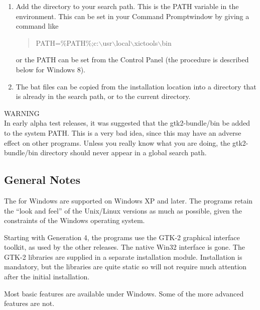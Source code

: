 \begin{enumerate}
\item{Add the directory to your search path.  This is the {\vt PATH}
variable in the environment.  This can be set in your {\cb Command
Prompt}window by giving a command like
\begin{quote}
 \vt PATH=\%PATH\%;c:$\backslash$usr$\backslash$local$\backslash$xictools$\backslash$bin
\end{quote}
or the {\vt PATH} can be set from the {\cb Control Panel} (the
procedure is described below for Windows 8).}

\item{The {\vt bat} files can be copied from the installation location
into a directory that is already in the search path, or to the current
directory.}
\end{enumerate}

WARNING\\
In early alpha test releases, it was suggested that the {\vt
gtk2-bundle/bin} be added to the system {\vt PATH}.  This is a very
bad idea, since this may have an adverse effect on other programs. 
Unless you really know what you are doing, the {\vt gtk2-bundle/bin}
directory should never appear in a global search path.

\subsection{General Notes}

The {\XicTools} for Windows are supported on Windows XP and later. 
The programs retain the ``look and feel'' of the Unix/Linux versions
as much as possible, given the constraints of the Windows operating
system.

Starting with Generation 4, the programs use the GTK-2 graphical
interface toolkit, as used by the other releases.  The native Win32
interface is gone.  The GTK-2 libraries are supplied in a separate
installation module.  Installation is mandatory, but the libraries are
quite static so will not require much attention after the initial
installation.

Most basic features are available under Windows.  Some of the more
advanced features are not.

